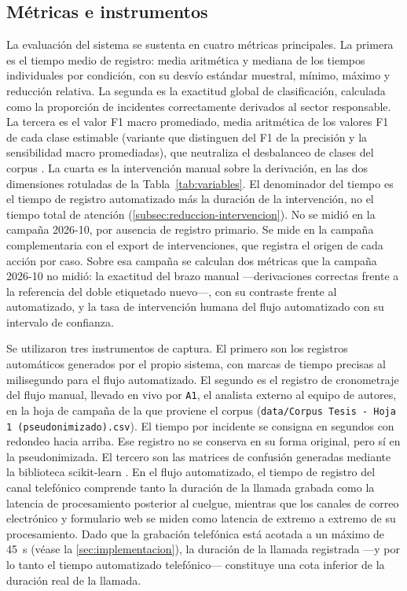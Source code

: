 \subsection{Métricas e instrumentos}\label{subsec:metricas-instrumentos}

La evaluación del sistema se sustenta en cuatro métricas principales. La primera es el tiempo medio de registro: media aritmética y mediana de los tiempos individuales por condición, con su desvío estándar muestral, mínimo, máximo y reducción relativa. La segunda es la exactitud global de clasificación, calculada como la proporción de incidentes correctamente derivados al sector responsable. La tercera es el valor F1 macro promediado, media aritmética de los valores F1 de cada clase estimable (variante que \textcite{Opitz2019_macro_f1} distinguen del F1 de la precisión y la sensibilidad macro promediadas), que neutraliza el desbalanceo de clases del corpus \parencite{Sokolova2009_performance_measures}. La cuarta es la intervención manual sobre la derivación, en las dos dimensiones rotuladas de la Tabla~\ref{tab:variables}. El denominador del tiempo es el tiempo de registro automatizado más la duración de la intervención, no el tiempo total de atención (\autoref{subsec:reduccion-intervencion}). No se midió en la campaña 2026-10, por ausencia de registro primario. Se mide en la campaña complementaria con el export de intervenciones, que registra el origen de cada acción por caso. Sobre esa campaña se calculan dos métricas que la campaña 2026-10 no midió: la exactitud del brazo manual ---derivaciones correctas frente a la referencia del doble etiquetado nuevo---, con su contraste frente al automatizado, y la tasa de intervención humana del flujo automatizado con su intervalo de confianza.

Se utilizaron tres instrumentos de captura. El primero son los registros automáticos generados por el propio sistema, con marcas de tiempo precisas al milisegundo para el flujo automatizado. El segundo es el registro de cronometraje del flujo manual, llevado en vivo por \texttt{A1}, el analista externo al equipo de autores, en la hoja de campaña de la que proviene el corpus (\texttt{data/Corpus Tesis - Hoja 1 (pseudonimizado).csv}). El tiempo por incidente se consigna en segundos con redondeo hacia arriba. Ese registro no se conserva en su forma original, pero sí en la pseudonimizada. El tercero son las matrices de confusión generadas mediante la biblioteca scikit-learn \parencite{Pedregosa2011_scikit_learn}. En el flujo automatizado, el tiempo de registro del canal telefónico comprende tanto la duración de la llamada grabada como la latencia de procesamiento posterior al cuelgue, mientras que los canales de correo electrónico y formulario web se miden como latencia de extremo a extremo de su procesamiento. Dado que la grabación telefónica está acotada a un máximo de 45~s (véase la \autoref{sec:implementacion}), la duración de la llamada registrada ---y por lo tanto el tiempo automatizado telefónico--- constituye una cota inferior de la duración real de la llamada.

